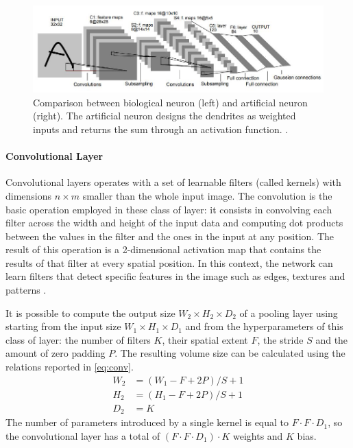 \begin{figure}[!h]
	\centering
	\includegraphics[width=\textwidth]{img/lenet5.jpg}

	\caption{ Comparison between biological neuron (left) and artificial neuron (right). The artificial neuron designs the dendrites as weighted inputs and returns the sum through an activation function. \cite{stanford2019cs231n}.}
	\label{fig:lenet5}
\end{figure}

\paragraph{Convolutional Layer}

Convolutional layers \cite{lecun1995convolutional} operates with a set of learnable filters (called kernels) with dimensions $n \times m$ smaller than the whole input image. The convolution is the basic operation employed in these class of layer: it consists in convolving each filter across the width and height of the input data and computing dot products between the values in the filter and the ones in the input at any position. The result of this operation is a 2-dimensional activation map that contains the results of that filter at every spatial position.  In this context, the network can learn filters that detect specific features in the image such as edges, textures and patterns \cite{erhan2009visualizing}.

It is possible to compute the output size $W_2 \times H_2 \times D_2$ of a pooling layer using starting from the input size $W_1 \times H_1 \times D_1$ and from the hyperparameters of this class of layer: the number of filters $K$, their spatial extent $F$, the stride $S$ and the amount of zero padding $P$. The resulting volume size can be calculated using the relations reported in \vref{eq:conv}.
\begin{equation} \label{eq:conv}
	\begin{aligned}
		W_2 & = (W_1 - F + 2P)/S + 1 \\
		H_2 & = (H_1 - F + 2P)/S + 1 \\
		D_2 & = K
	\end{aligned}
\end{equation}
The number of parameters introduced by a single kernel is equal to $F \cdot F \cdot D_1$, so the convolutional layer has a total of $(F \cdot F \cdot D_1) \cdot K$ weights and $K$ bias.

